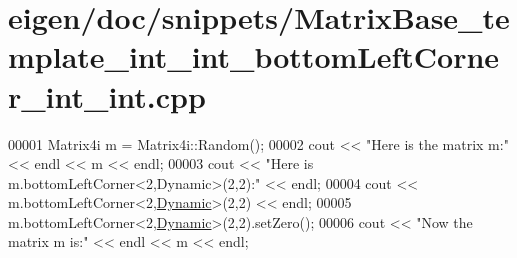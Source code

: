 \hypertarget{eigen_2doc_2snippets_2_matrix_base__template__int__int__bottom_left_corner__int__int_8cpp_source}{}\section{eigen/doc/snippets/\+Matrix\+Base\+\_\+template\+\_\+int\+\_\+int\+\_\+bottom\+Left\+Corner\+\_\+int\+\_\+int.cpp}
\label{eigen_2doc_2snippets_2_matrix_base__template__int__int__bottom_left_corner__int__int_8cpp_source}

\begin{DoxyCode}
00001 Matrix4i m = Matrix4i::Random();
00002 cout << \textcolor{stringliteral}{"Here is the matrix m:"} << endl << m << endl;
00003 cout << \textcolor{stringliteral}{"Here is m.bottomLeftCorner<2,Dynamic>(2,2):"} << endl;
00004 cout << m.bottomLeftCorner<2,\hyperlink{namespace_eigen_ad81fa7195215a0ce30017dfac309f0b2}{Dynamic}>(2,2) << endl;
00005 m.bottomLeftCorner<2,\hyperlink{namespace_eigen_ad81fa7195215a0ce30017dfac309f0b2}{Dynamic}>(2,2).setZero();
00006 cout << \textcolor{stringliteral}{"Now the matrix m is:"} << endl << m << endl;
\end{DoxyCode}
